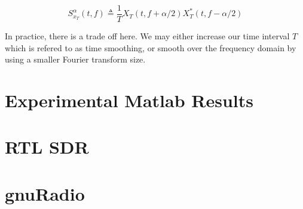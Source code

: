 \begin{equation}
S_{x_T}^{\alpha}(t,f) \triangleq \frac{1}{T} X_T(t,f + \alpha / 2)X_T^*(t,f - \alpha / 2)
\label{eq:ScdDefined2}
\end{equation}

In practice, there is a trade off here.  We may either increase our time
interval $T$ which is refered to as time smoothing, or smooth over the frequency
domain by using a smaller Fourier transform size.

\begin{comment}
Next talk about how the SCD is a 3 dimentional plot and can be used to
determine the modulation but is not a comutationally efficient metric.

Go into the Spectral coherence as a better metric.
\end{comment}


\section{Experimental Matlab Results}


\section{RTL SDR}
\section{gnuRadio}
